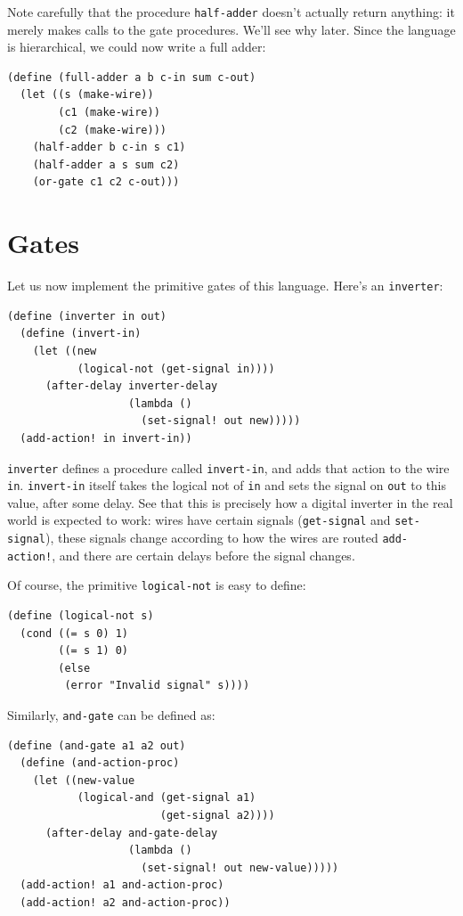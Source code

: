 \documentclass[9pt]{report}
\begin{document}
Note carefully that the procedure \texttt{half-adder} doesn't actually
return anything: it merely makes calls to the gate procedures.
We'll see why later. Since the language is hierarchical, we could
now write a full adder:

\begin{verbatim}
(define (full-adder a b c-in sum c-out)
  (let ((s (make-wire))
        (c1 (make-wire))
        (c2 (make-wire)))
    (half-adder b c-in s c1)
    (half-adder a s sum c2)
    (or-gate c1 c2 c-out)))
\end{verbatim}

\section{Gates}
\label{sec:org9800e30}

Let us now implement the primitive gates of this language. Here's
an \texttt{inverter}:

\begin{verbatim}
(define (inverter in out)
  (define (invert-in)
    (let ((new
           (logical-not (get-signal in))))
      (after-delay inverter-delay
                   (lambda ()
                     (set-signal! out new)))))
  (add-action! in invert-in))
\end{verbatim}

\texttt{inverter} defines a procedure called \texttt{invert-in}, and adds that
action to the wire \texttt{in}. \texttt{invert-in} itself takes the logical not
of \texttt{in} and sets the signal on \texttt{out} to this value, after some
delay. See that this is precisely how a digital inverter in the
real world is expected to work: wires have certain signals
(\texttt{get-signal} and \texttt{set-signal}), these signals change according to
how the wires are routed \texttt{add-action!}, and there are certain
delays before the signal changes.

Of course, the primitive \texttt{logical-not} is easy to define:

\begin{verbatim}
(define (logical-not s)
  (cond ((= s 0) 1)
        ((= s 1) 0)
        (else
         (error "Invalid signal" s))))
\end{verbatim}

Similarly, \texttt{and-gate} can be defined as:

\begin{verbatim}
(define (and-gate a1 a2 out)
  (define (and-action-proc)
    (let ((new-value
           (logical-and (get-signal a1)
                        (get-signal a2))))
      (after-delay and-gate-delay
                   (lambda ()
                     (set-signal! out new-value)))))
  (add-action! a1 and-action-proc)
  (add-action! a2 and-action-proc))
\end{verbatim}
\end{document}
